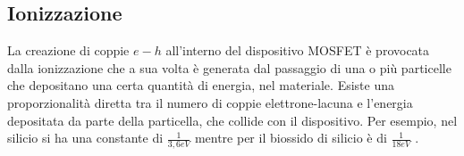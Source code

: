 \vspace{0.5cm}

\subsection{Ionizzazione}\label{cap1:ionizzazione}
La creazione di coppie $e-h$ all'interno del dispositivo MOSFET è provocata dalla ionizzazione che a sua volta è generata dal passaggio di una o più particelle che depositano una certa quantità di energia, nel materiale. Esiste una proporzionalità diretta tra il numero di coppie elettrone-lacuna e l'energia depositata da parte della particella, che collide con il dispositivo. Per esempio, nel silicio si ha una constante di $\frac{1}{3,6eV}$ mentre per il biossido di silicio è di $\frac{1}{18eV}$ \cite{bib:Effetti_Radiazioni_NASA}.





\vspace{0.5cm}

